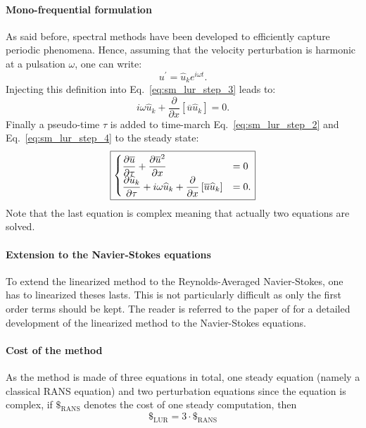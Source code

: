 \paragraph{Mono-frequential formulation}
As said before, spectral methods have been developed to efficiently
capture periodic phenomena.
Hence, assuming that the velocity perturbation is harmonic at 
a pulsation $\omega$, one can write:
\begin{equation}
	u^\prime = \widehat{u}_k e^{i \omega t}.
\end{equation}
Injecting this definition into Eq.~\ref{eq:sm_lur_step_3} leads
to:
\begin{equation}
	i \omega \widehat{u}_k +
	\frac{\partial}{\partial x} \left[
	\overline{u} \widehat{u}_k \right] = 
	0.
	\label{eq:sm_lur_step_4}
\end{equation}
Finally a pseudo-time $\tau$ is added to time-march 
Eq.~\ref{eq:sm_lur_step_2} and Eq.~\ref{eq:sm_lur_step_4}
to the steady state:
\begin{equation}
	\fbox{$
	\begin{cases}
		\displaystyle 
		\frac{\partial \overline{u}}{\partial \tau} +
		\frac{\partial 
			\overline{u}^2}{\partial x} &= 0 \\
		\displaystyle \frac{\partial \widehat{u}_k}{\partial \tau} +
		i \omega \widehat{u}_k +
			\frac{\partial}{\partial x} \left[
			\overline{u} \widehat{u}_k \right] &= 
			0.
	\end{cases}
	$}
\end{equation}
Note that the last equation is complex meaning that actually two
equations are solved.

\paragraph{Extension to the Navier-Stokes equations}
To extend the linearized method to the Reynolds-Averaged
Navier-Stokes, one has to linearized theses lasts. This
is not particularly difficult as only the first order terms should
be kept. The reader is referred to the paper of \citet{Clark2000} for
a detailed development of the linearized method to the Navier-Stokes
equations.

\paragraph{Cost of the method}
As the method is made of three equations in total, one steady equation 
(namely a classical RANS equation) and two perturbation equations
since the equation is complex, if $\mathdollar_{\text{RANS}}$ 
denotes the cost of
one steady computation, then
\begin{equation}
	\mathdollar_{\text{LUR}} = 3 \cdot \mathdollar_{\text{RANS}}
\end{equation}